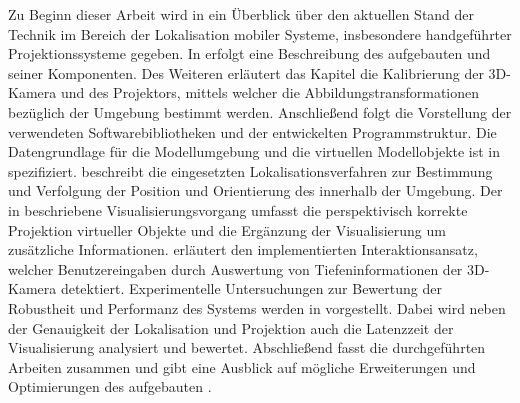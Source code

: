 Zu Beginn dieser Arbeit wird in  ein Überblick über den aktuellen Stand der Technik im Bereich der Lokalisation mobiler Systeme, insbesondere handgeführter Projektionssysteme gegeben. In  erfolgt eine Beschreibung des aufgebauten  und seiner Komponenten. Des Weiteren erläutert das Kapitel die Kalibrierung der 3D-Kamera und des Projektors, mittels welcher die Abbildungstransformationen bezüglich der Umgebung bestimmt werden. Anschließend folgt die Vorstellung der verwendeten Softwarebibliotheken und der entwickelten Programmstruktur. Die Datengrundlage für die Modellumgebung und die virtuellen Modellobjekte ist in  spezifiziert.  beschreibt die eingesetzten Lokalisationsverfahren zur Bestimmung und Verfolgung der Position und Orientierung des  innerhalb der Umgebung. Der in  beschriebene Visualisierungsvorgang umfasst die perspektivisch korrekte Projektion virtueller Objekte und die Ergänzung der Visualisierung um zusätzliche Informationen.  erläutert den implementierten Interaktionsansatz, welcher Benutzereingaben durch Auswertung von Tiefeninformationen der 3D-Kamera detektiert. Experimentelle Untersuchungen zur Bewertung der Robustheit und Performanz des Systems werden in  vorgestellt. Dabei wird neben der Genauigkeit der Lokalisation und Projektion auch die Latenzzeit der Visualisierung analysiert und bewertet. Abschließend fasst  die durchgeführten Arbeiten zusammen und gibt eine Ausblick auf mögliche Erweiterungen und Optimierungen des aufgebauten .

